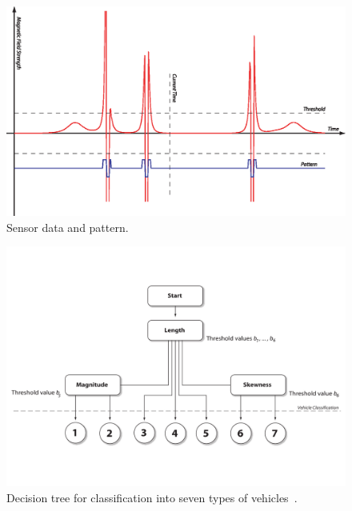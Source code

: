 \begin{figure}[htb]
 \centering
 \begin{minipage}{0.9\linewidth}
 \centering
 \includegraphics[width=\linewidth]{images/sensordata}
 \caption[Sensor data and pattern]{Sensor data and pattern.}
 \label{fig:pattern}
 \end{minipage}
\end{figure}

\begin{figure}
 \centering
 \begin{minipage}{0.8\linewidth}
 \centering
 \includegraphics[width=1\linewidth]{images/decision}
 \caption[Decision tree for classification]{Decision tree for classification into seven types of vehicles~\cite{sun2000}.}
 \label{fig:decision}
 \end{minipage}
\end{figure}

